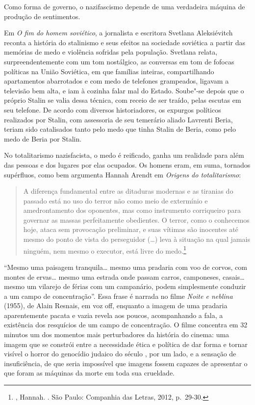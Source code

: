 Como forma de governo, o nazifascismo depende de uma verdadeira máquina
de produção de sentimentos.

\asterisc

Em \emph{O fim do homem soviético}, a jornalista e escritora Svetlana
Aleksiévitch reconta a história do stalinismo e seus efeitos na sociedade
soviética a partir das memórias de medo e violência sofridas pela
população. Svetlana relata, surpreendentemente com um tom nostálgico, as
conversas em tom de fofocas políticas na União Soviética, em que
famílias inteiras, compartilhando apartamentos abarrotados e com medo de
telefones grampeados, ligavam a televisão bem alta, e iam à cozinha
falar mal do Estado. Soube"-se depois que o próprio Stalin se valia dessa
técnica, com receio de ser traído, pelas escutas em seu telefone. De
acordo com diversos historiadores, os expurgos políticos realizados por
Stalin, com assessoria de seu temerário aliado Lavrenti Beria, teriam
sido catalisados tanto pelo medo que tinha Stalin de Beria, como pelo
medo de Beria por Stalin.

No totalitarismo nazisfacista, o medo é reificado, ganha um realidade
para além das pessoas e dos lugares por elas ocupados. Os homens eram,
em suma, tornados supérfluos, como bem argumenta Hannah Arendt em
\emph{Origens do totalitarismo}:

\begin{quote}
A diferença fundamental entre as ditaduras modernas e as tiranias do
passado está no uso do terror não como meio de extermínio e
amedrontamento dos oponentes, mas como instrumento corriqueiro para
governar as massas perfeitamente obedientes. O terror, como o conhecemos
hoje, ataca sem provocação preliminar, e suas vítimas são inocentes até
mesmo do ponto de vista do perseguidor (\ldots{}) leva à situação na qual
jamais ninguém, nem mesmo o executor, está livre do medo.\footnote{,
  Hannah. {}. São Paulo: Companhia das Letras, 2012, p.~29-30.}
\end{quote}

\asterisc

``Mesmo uma paisagem tranquila\ldots{} mesmo uma pradaria com voo de corvos,
com montes de ervas\ldots{} mesmo uma estrada onde passam carros, camponeses,
casais\ldots{} mesmo um vilarejo de férias com um campanário, podem
simplesmente conduzir a um campo de concentração''. Essa frase é
narrada no filme \emph{Noite e neblina} (1955), de Alain Resnais, em voz off,
enquanto a imagem de uma pradaria aparentemente pacata e vazia revela
aos poucos, acompanhando a fala, a existência dos resquícios de um campo
de concentração. O filme concentra em 32 minutos um dos momentos mais
perturbadores da história do cinema: uma imagem que se constrói entre a
necessidade ética e política de dar forma e tornar visível o horror do
genocídio judaico do século , por um lado, e a sensação de
insuficiência, de que seria impossível que imagens fossem capazes de
apresentar o que foram as máquinas da morte em toda sua crueldade.

